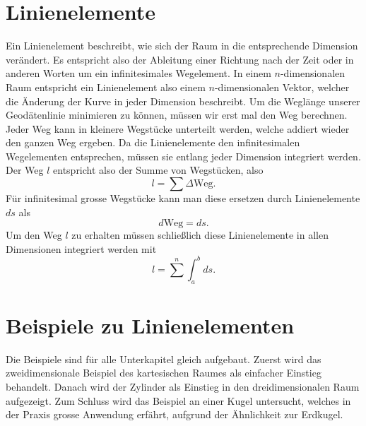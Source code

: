 %
%
%
%
\section{Linienelemente\label{geodaeten:section:Linienelemente}}

Ein Linienelement beschreibt, wie sich der Raum in die entsprechende Dimension verändert.
Es entspricht also der Ableitung einer Richtung nach der Zeit oder in anderen Worten um ein infinitesimales Wegelement.
In einem $n$-dimensionalen Raum entspricht ein Linienelement also einem $n$-dimensionalen Vektor, welcher die Änderung der Kurve in jeder Dimension beschreibt.
Um die Weglänge unserer Geodätenlinie minimieren zu können, müssen wir erst mal den Weg berechnen.
Jeder Weg kann in kleinere Wegstücke unterteilt werden, welche addiert wieder den ganzen Weg ergeben.
Da die Linienelemente den infinitesimalen Wegelementen entsprechen, müssen sie entlang jeder Dimension integriert werden.
Der Weg $l$ entspricht also der Summe von Wegstücken, also
\begin{equation}
	l = \sum \Delta \text{Weg} .
\end{equation}
Für infinitesimal grosse Wegstücke kann man diese ersetzen durch Linienelemente $ds$  als
\begin{equation}	
	d\text{Weg} = ds .
	\label{geodaeten:equation:Linienelemente:equation1}
\end{equation}
Um den Weg $l$ zu erhalten müssen schließlich diese Linienelemente in allen Dimensionen integriert werden mit
\begin{equation}
	l = 
	\sum^{n} \int_a^b ds .
	\label{geodaeten:equation:Linienelemente:equation2}
\end{equation}

\section{Beispiele zu Linienelementen\label{geodaeten:section:Linienelemente:Beispiele}}
Die Beispiele sind für alle Unterkapitel gleich aufgebaut.
Zuerst wird das zweidimensionale Beispiel des kartesischen Raumes als einfacher Einstieg behandelt.
Danach wird der Zylinder als Einstieg in den dreidimensionalen Raum aufgezeigt.
Zum Schluss wird das Beispiel an einer Kugel untersucht, welches in der Praxis grosse Anwendung erfährt, aufgrund der Ähnlichkeit zur Erdkugel.

	
	
	

